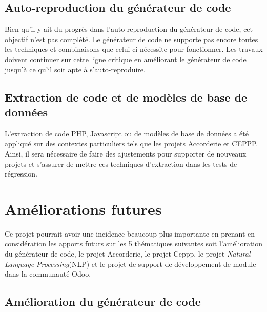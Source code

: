 \subsection{Auto-reproduction du générateur de code}
Bien qu'il y ait du progrès dans l'auto-reproduction du générateur de code, cet objectif n'est pas complété. Le générateur de code ne supporte pas encore toutes les techniques et combinaisons que celui-ci nécessite pour fonctionner. Les travaux doivent continuer sur cette ligne critique en améliorant le générateur de code jusqu'à ce qu'il soit apte à s'auto-reproduire.

\subsection{Extraction de code et de modèles de base de données}
L'extraction de code PHP, Javascript ou de modèles de base de données a été appliqué sur des contextes particuliers tels que les projets Accorderie et CEPPP. Ainsi, il sera nécessaire de faire des ajustements pour supporter de nouveaux projets et s'assurer de mettre ces techniques d'extraction dans les tests de régression.

\section{Améliorations futures}


Ce projet pourrait avoir une incidence beaucoup plus importante en prenant en considération les apports futurs sur les 5 thématiques suivantes soit l'amélioration du générateur de code, le projet Accorderie, le projet Ceppp, le projet \textit{Natural Language Processing}(NLP) et le projet de support de développement de module dans la communauté Odoo.

\subsection{Amélioration du générateur de code}


